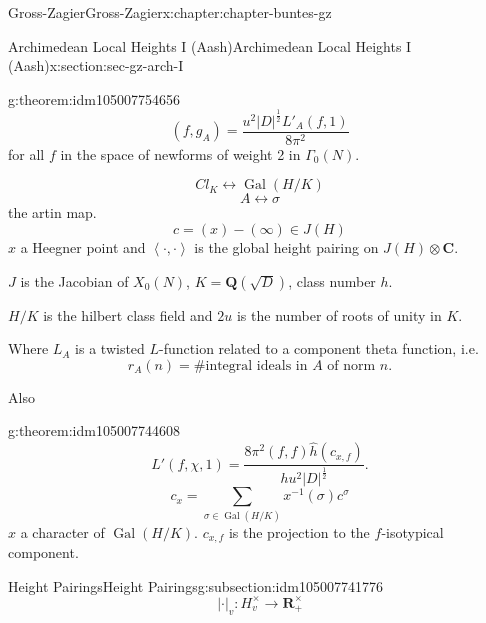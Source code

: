 \documentclass[oneside,10pt,]{book}
\numberwithin{equation}{section}
\newcommand{\inv}{^{-1}}
\newcommand{\pair}[2]{\left\langle #1, #2 \right\rangle}
\newcommand{\QQ}{\mathbf{Q}}
\newcommand{\RR}{\mathbf{R}}
\newcommand{\CC}{\mathbf{C}}
\newcommand{\Gal}[2]{\operatorname{Gal}(#1/#2)}
\begin{document}
\begin{chapterptx}{Gross-Zagier}{}{Gross-Zagier}{}{}{x:chapter:chapter-buntes-gz}
\begin{sectionptx}{Archimedean Local Heights I (Aash)}{}{Archimedean Local Heights I (Aash)}{}{}{x:section:sec-gz-arch-I}
\begin{introduction}{}
\begin{theorem}{}{}{g:theorem:idm105007754656}
\begin{equation*}
(f,g_A) = \frac{u^2 |D|^{\frac 12} L'_A(f,1)}{8\pi ^2}
\end{equation*}
for all \(f\) in the space of newforms of weight 2 in \(\Gamma _0(N)\).%
\end{theorem}
%
\begin{equation*}
Cl_K \leftrightarrow \Gal HK
\end{equation*}
%
\begin{equation*}
A \leftrightarrow \sigma 
\end{equation*}
the artin map.%
\begin{equation*}
c = (x) - (\infty ) \in J(H)
\end{equation*}
\(x\) a Heegner point and \(\pair \cdot\cdot\) is the global height pairing on \(J(H) \otimes \CC\).%
\par
\(J\) is the Jacobian of \(X_0(N)\), \(K = \QQ(\sqrt{D})\), class  number \(h\).%
\par
\(H/K\) is the hilbert class field and \(2u\) is the number of roots of unity in \(K\).%
\par
Where \(L_A\) is a twisted \(L\)-function related to a component theta function, i.e.%
\begin{equation*}
r_A(n) =\# \text{integral ideals in } A \text{ of norm }n\text{.}
\end{equation*}
%
\par
Also%
\begin{theorem}{}{}{g:theorem:idm105007744608}%
%
\begin{equation*}
L'(f,\chi ,1) = \frac{8\pi ^2 (f, f) \hat h(c_{x,f})}{hu^2 |D|^{\frac12}}\text{.}
\end{equation*}
%
\begin{equation*}
c_x = \sum_{\sigma \in \Gal HK} x\inv(\sigma ) c^\sigma 
\end{equation*}
\(x\) a character of \(\Gal HK\). \(c_{x,f}\) is the projection to the \(f\)-isotypical component.%
\end{theorem}
\end{introduction}%
%
%
\typeout{************************************************}
\typeout{************************************************}
%
\begin{subsectionptx}{Height Pairings}{}{Height Pairings}{}{}{g:subsection:idm105007741776}
%
\begin{equation*}
| \cdot |_v \colon  H_v^\times \to \RR_+^\times
\end{equation*}
%
\begin{equation*}

\end{equation*}
\end{subsectionptx}
\end{sectionptx}
\end{chapterptx}
\end{document}

